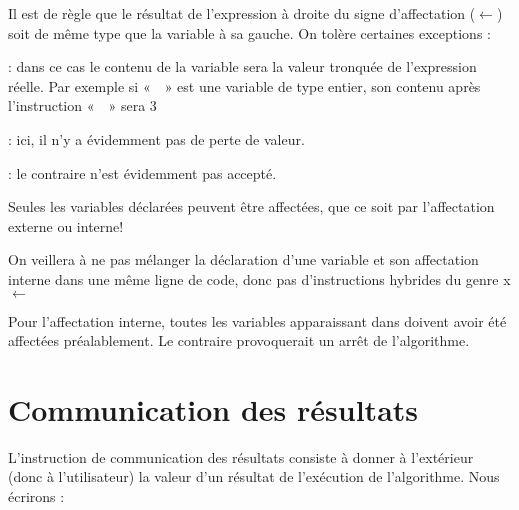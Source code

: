 			\begin{liste}
			\item
				Il est de règle que le résultat de l’expression à droite du signe
				d’affectation ($\gets$) soit de
				même type que la variable à sa gauche. On tolère certaines exceptions
				:
				\begin{liste}
				\item
					 : 
					dans ce cas le contenu de la variable sera la valeur tronquée
					de l’expression réelle. 
					Par exemple si «~~» est
					une variable de type entier, son contenu après l’instruction
					«~~» 
					sera 3
				\item 
					 :
					ici, il n'y a évidemment pas de perte de valeur.
				\item 
					 : 
					le contraire n'est évidemment pas accepté.
				\end{liste}
			\item 
				Seules les variables déclarées peuvent être affectées, que ce soit par
				l’affectation externe ou interne!
			\item 
				On veillera à ne pas mélanger la déclaration d’une variable et son
				affectation interne dans une même ligne de code, donc pas
				d’instructions hybrides du genre 
				\textsf{x}{ $\gets$ }
			\item 
				Pour l’affectation interne, toutes les variables apparaissant dans
				 doivent avoir été affectées
				préalablement. Le contraire provoquerait un arrêt de l’algorithme.
			\end{liste}
			
	\section{Communication des résultats}

		L’instruction de communication des résultats consiste à donner à
		l’extérieur (donc à l’utilisateur) la valeur d’un résultat de
		l’exécution de l’algorithme. Nous écrirons :


